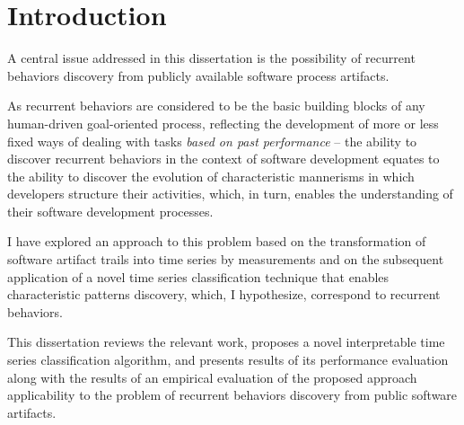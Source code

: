 \chapter{Introduction}\label{chapter_introduction}
A central issue addressed in this dissertation is the possibility of recurrent behaviors discovery 
from publicly available software process artifacts. 

As recurrent behaviors are considered to be the basic building blocks of any human-driven
goal-oriented process, reflecting the development of more or less fixed ways of dealing 
with tasks \textit{based on past performance} \cite{neal2012habits} \cite{1903} -- 
the ability to discover recurrent behaviors in the context of software development equates 
to the ability to discover the evolution of characteristic mannerisms in which developers 
structure their activities, which, in turn, enables the understanding of their software 
development processes.  

I have explored an approach to this problem based on the transformation of software artifact trails 
into time series by measurements and on the subsequent application of a novel time series 
classification technique that enables characteristic patterns discovery, which, 
I hypothesize, correspond to recurrent behaviors.

This dissertation reviews the relevant work, proposes a novel interpretable time series 
classification algorithm, and presents results of its performance evaluation along with 
the results of an empirical evaluation of the proposed approach applicability to the problem 
of recurrent behaviors discovery from public software artifacts.


